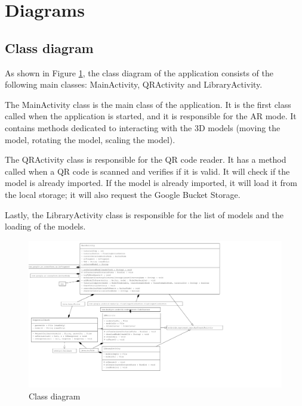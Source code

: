 \clearpage

\section{Diagrams}
\subsection*{Class diagram}
As shown in Figure \ref{fig:ClassDiagram}, the class diagram of the application consists of the following main classes: MainActivity, QRActivity and LibraryActivity.

The MainActivity class is the main class of the application. It is the first class called when the application is started, and it is responsible for the \ac{AR} mode. It contains methods dedicated to interacting with the \ac{3D} models (moving the model, rotating the model, scaling the model).

The QRActivity class is responsible for the \ac{QR} code reader. It has a method called when a \ac{QR} code is scanned and verifies if it is valid. It will check if the model is already imported. If the model is already imported, it will load it from the local storage; it will also request the Google Bucket Storage.

Lastly, the LibraryActivity class is responsible for the list of models and the loading of the models.
\begin{figure}[ht]
    \centering
    \includegraphics[height=0.9\textwidth]{img/ClassDiagram.png}
    \caption{Class diagram}
    \label{fig:ClassDiagram}
\end{figure}


